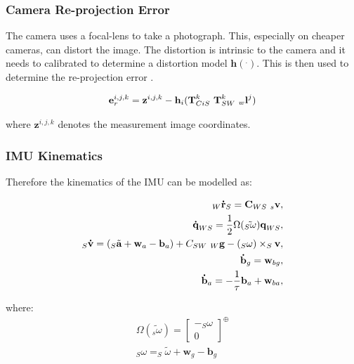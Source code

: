 \documentclass[a4paper,11pt,notitlepage]{article}
\begin{document}
\subsubsection{Camera Re-projection Error}

The camera uses a focal-lens to take a photograph. This, especially on cheaper cameras, can distort the image. The distortion is intrinsic to the camera and it needs to calibrated to determine a distortion model $\mathbf{h}(^{.})$. This is then used to determine the re-projection error \cite{Furgale}.

\begin{equation}
\begin{aligned}
\textbf{e}_{r}^{i,j,k} = \textbf{z}^{i,j,k} - \textbf{h}_{i} (\textbf{T}^{k}_{CiS} \textnormal{ } \textbf{T}^{k}_{SW} \textnormal{ } _{w}\textbf{l}^{j})
\end{aligned}
\end{equation}

where $\textbf{z}^{i,j,k}$ denotes the measurement image coordinates.

\subsubsection{IMU Kinematics}

Therefore the kinematics of the IMU can be modelled as:

\begin{equation}
\begin{aligned}
\label{imu_kin}
_{W} \textbf{\.{r}}_{S} = \textbf{C}_{WS} \textnormal{ } _{s}\textbf{v}, \\
\textbf{\.{q}}_{WS} = \frac{1}{2} \Omega(\tilde{_{S}\textbf{$\omega$}})\textbf{q}_{WS}, \\
_{S}\textbf{\.{v}}= (_{S}\tilde{\textbf{a}} + \textbf{w}_{a} - \textbf{b}_{a}) + C_{SW} \textnormal{ } _{W}\textbf{g} - (_{S}\textbf{$\omega$}) \times _{S}\textbf{v}, \\
\textbf{\.{b}}_{g} = \textbf{w}_{bg}, \\
\textbf{\.{b}}_{a} = -\frac{1}{\tau}\textbf{b}_{a} + \textbf{w}_{ba}, \\
\end{aligned}
\end{equation}

where:
\begin{equation}
\begin{aligned}
 \Omega(\tilde{_{s}\textbf{$\omega$}}) = \begin{bmatrix}
       -_{S}\textbf{$\omega$}  \\[0.3em]
       0
     \end{bmatrix} ^{\oplus} \\
_{S}\textbf{$\omega$} =  _{S}\tilde{\textbf{$\omega$}} + \textbf{w}_{g} - \textbf{b}_{g}
\end{aligned}
\end{equation}
\end{document}
